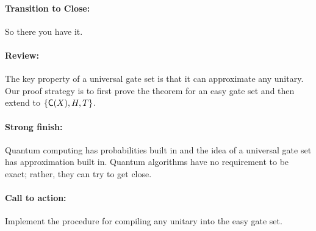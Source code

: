 \documentclass[11pt]{article}
\def\C#1{\text{\sf C}{(#1)}}
\begin{document}
\paragraph{Transition to Close:} 
So there you have it.

\paragraph{Review:}
The key property of a universal gate set is that 
it can approximate any unitary.
Our proof strategy is to first prove the theorem for an easy gate set and then
extend to $\{\C{X}, H, T\}$.

\paragraph{Strong finish:}
Quantum computing has probabilities built in and
the idea of a universal gate set has approximation built in.
Quantum algorithms have no requirement to be exact; 
rather, they can try to get close.

\paragraph{Call to action:}
Implement the procedure for compiling any unitary into the easy gate set.
\end{document}
